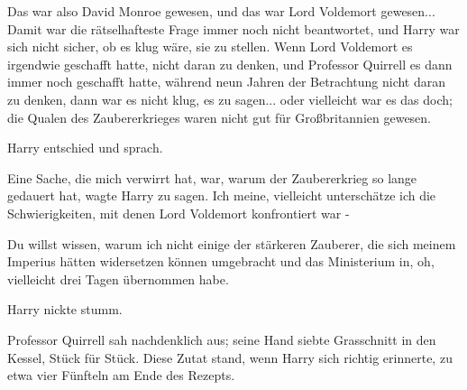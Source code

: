 Das war also David Monroe gewesen, und das war Lord Voldemort gewesen... Damit
war die rätselhafteste Frage immer noch nicht beantwortet, und Harry war sich
nicht sicher, ob es klug wäre, sie zu stellen. Wenn Lord Voldemort es irgendwie
geschafft hatte, nicht daran zu denken, und Professor Quirrell es dann immer
noch geschafft hatte, während neun Jahren der Betrachtung nicht daran zu denken,
dann war es nicht klug, es zu sagen... oder vielleicht war es das doch; die
Qualen des Zaubererkrieges waren nicht gut für Großbritannien gewesen.

Harry entschied und sprach.

\glqq{}Eine Sache, die mich verwirrt hat, war, warum der Zaubererkrieg so lange
gedauert hat\grqq{}, wagte Harry zu sagen. \glqq{}Ich meine, vielleicht
unterschätze ich die Schwierigkeiten, mit denen Lord Voldemort konfrontiert war
-\grqq{}

\glqq{}Du willst wissen, warum ich nicht einige der stärkeren Zauberer, die sich
meinem Imperius hätten widersetzen können umgebracht und das Ministerium in, oh,
vielleicht drei Tagen übernommen habe.\grqq{}

Harry nickte stumm.

Professor Quirrell sah nachdenklich aus; seine Hand siebte Grasschnitt in den
Kessel, Stück für Stück. Diese Zutat stand, wenn Harry sich richtig erinnerte,
zu etwa vier Fünfteln am Ende des Rezepts.

